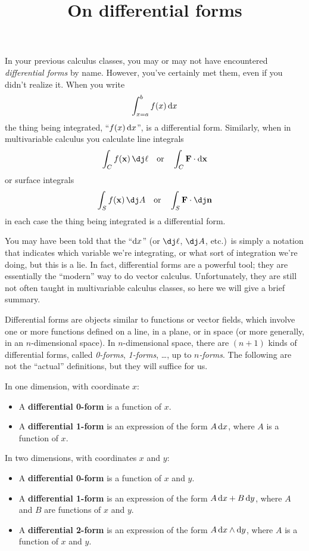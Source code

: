 \documentclass[12pt]{amsart}
\title{On differential forms}
\begin{document}
\maketitle

In your previous calculus classes, you may or may not have encountered \emph{differential forms} by name.
However, you've certainly met them, even if you didn't realize it.
When you write
\[ \int_{x=a}^b f(x) \,{\mathrm{d} x} \]
the thing being integrated, ``$f(x) \,{\mathrm{d} x}$'', is a differential form.
Similarly, when in multivariable calculus you calculate line integrals
\[ \int_{\curve} f(\ptx) \, \dl \quad\text{or}\quad \int_{\curve} \dotp{\vc{F}}{\dpx} \]
or surface integrals
\[ \int_{\surf} f(\ptx) \,\dA \quad\text{or}\quad \int_{\surf} \dotp{\vc{F}}{\dn} \]
in each case the thing being integrated is a differential form.

You may have been told that the ``${\mathrm{d} x}$'' (or $\dl$, $\dA$, etc.)\ is simply a notation that indicates which variable we're integrating, or what sort of integration we're doing, but this is a lie.
In fact, differential forms are a powerful tool; they are essentially the ``modern'' way to do vector calculus.
Unfortunately, they are still not often taught in multivariable calculus classes, so here we will give a brief summary.

Differential forms are objects similar to functions or vector fields, which involve one or more functions defined on a line, in a plane, or in space (or more generally, in an $n$-dimensional space).
In $n$-dimensional space, there are $(n+1)$ kinds of differential forms, called \emph{0-forms}, \emph{1-forms}, \dots, up to \emph{$n$-forms}.
The following are not the ``actual'' definitions, but they will suffice for us.

\begin{defn}
  In one dimension, with coordinate $x$:
  \begin{itemize}
  \item A \textbf{differential 0-form} is a function of $x$.
  \item A \textbf{differential 1-form} is an expression of the form $A\,{\mathrm{d} x}$, where $A$ is a function of $x$.
  \end{itemize}
\end{defn}

\begin{defn}
  In two dimensions, with coordinates $x$ and $y$:
  \begin{itemize}
  \item A \textbf{differential 0-form} is a function of $x$ and $y$.
  \item A \textbf{differential 1-form} is an expression of the form $A\,{\mathrm{d} x}+B\,{\mathrm{d} y}$, where $A$ and $B$ are functions of $x$ and $y$.
  \item A \textbf{differential 2-form} is an expression of the form $A\,{\mathrm{d} x}\wedge{\ensuremath{\mathrm{d} y}}$, where $A$ is a function of $x$ and $y$.
  \end{itemize}
\end{defn}
\end{document}
